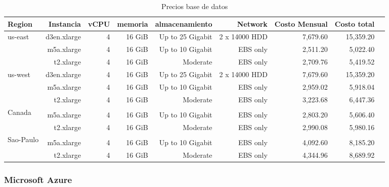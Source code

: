 \documentclass{article}
\begin{document}
\begin{table}[!htp]\centering
\caption{Precios base de datos}\label{tab: }
\scriptsize
\begin{tabular}{lrrrrrrrr}\toprule
Region &Instancia &vCPU &memoria &almacenamiento &Network &Costo Mensual &Costo total \\\midrule
\multirow{3}{*}{us-east} &d3en.xlarge &4 &16 GiB &Up to 25 Gigabit &2 x 14000 HDD &7,679.60 &15,359.20 \\
&m5a.xlarge &4 &16 GiB &Up to 10 Gigabit &EBS only &2,511.20 &5,022.40 \\
&t2.xlarge &4 &16 GiB &Moderate &EBS only &2,709.76 &5,419.52 \\
  \midrule
\multirow{3}{*}{us-west} &d3en.xlarge &4 &16 GiB &Up to 25 Gigabit &2 x 14000 HDD &7,679.60 &15,359.20 \\
&m5a.xlarge &4 &16 GiB &Up to 10 Gigabit &EBS only &2,959.02 &5,918.04 \\
&t2.xlarge &4 &16 GiB &Moderate &EBS only &3,223.68 &6,447.36 \\
  \midrule
\multirow{3}{*}{Canada} &\cellcolor[HTML]{A8A8A8} &\cellcolor[HTML]{A8A8A8} &\cellcolor[HTML]{A8A8A8} &\cellcolor[HTML]{A8A8A8} &\cellcolor[HTML]{A8A8A8} &\cellcolor[HTML]{A8A8A8} &\cellcolor[HTML]{A8A8A8} \\
&m5a.xlarge &4 &16 GiB &Up to 10 Gigabit &EBS only &2,803.20 &5,606.40 \\
&t2.xlarge &4 &16 GiB &Moderate &EBS only &2,990.08 &5,980.16 \\
  \midrule
\multirow{3}{*}{Sao-Paulo} &\cellcolor[HTML]{A8A8A8} &\cellcolor[HTML]{A8A8A8} &\cellcolor[HTML]{A8A8A8} &\cellcolor[HTML]{A8A8A8} &\cellcolor[HTML]{A8A8A8} &\cellcolor[HTML]{A8A8A8} &\cellcolor[HTML]{A8A8A8} \\
&m5a.xlarge &4 &16 GiB &Up to 10 Gigabit &EBS only &4,092.60 &8,185.20 \\
&t2.xlarge &4 &16 GiB &Moderate &EBS only &4,344.96 &8,689.92 \\
\bottomrule
\end{tabular}
\end{table}

\newpage
  
  \subsubsection*{Microsoft Azure}
\end{document}
